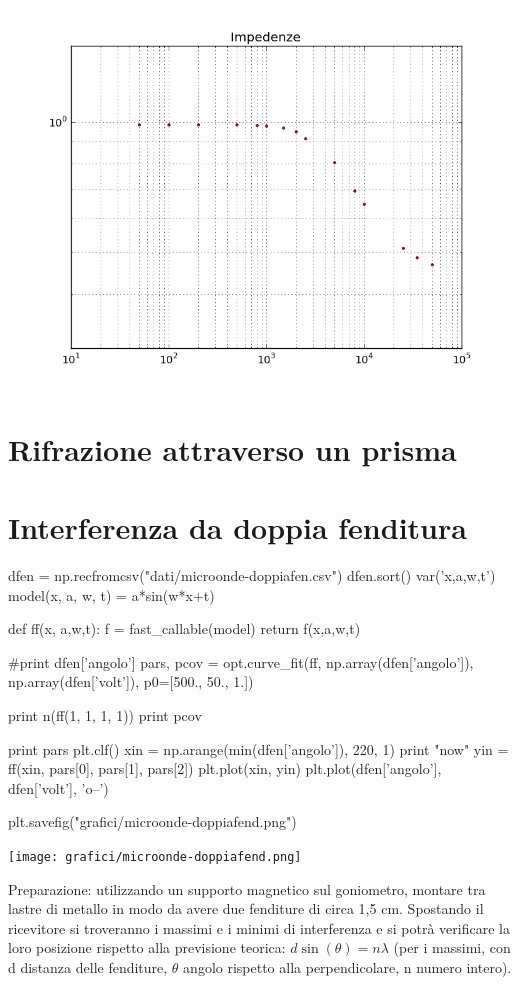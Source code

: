 \begin{center}
\includegraphics[scale=0.75]{grafici/C2-2.png} 
\end{center}

\section{Rifrazione attraverso un prisma}

\section{Interferenza da doppia fenditura}
\begin{sagesilent}
dfen = np.recfromcsv("dati/microonde-doppiafen.csv")
dfen.sort()
var('x,a,w,t')
model(x, a, w, t) = a*sin(w*x+t)

def ff(x, a,w,t):
  f = fast_callable(model)
  return f(x,a,w,t)

#print dfen['angolo']
pars, pcov = opt.curve_fit(ff, np.array(dfen['angolo']), np.array(dfen['volt']), p0=[500., 50., 1.])

print n(ff(1, 1, 1, 1))
print pcov

print pars
plt.clf()
xin = np.arange(min(dfen['angolo']), 220, 1)
print "now"
yin = ff(xin, pars[0], pars[1], pars[2])
plt.plot(xin, yin)
plt.plot(dfen['angolo'], dfen['volt'], 'o--')

plt.savefig("grafici/microonde-doppiafend.png")
\end{sagesilent}

\texttt{[image: grafici/microonde-doppiafend.png]}

Preparazione: utilizzando un supporto magnetico sul goniometro, montare tra lastre di metallo in modo da avere due
fenditure di circa 1,5 cm. Spostando il ricevitore si troveranno i massimi e i minimi di interferenza e si potrà verificare la
loro posizione rispetto alla previsione teorica: $d \sin(\theta) = n \lambda$ (per i massimi, con d distanza delle fenditure, $\theta$ angolo
rispetto alla perpendicolare, n numero intero).

